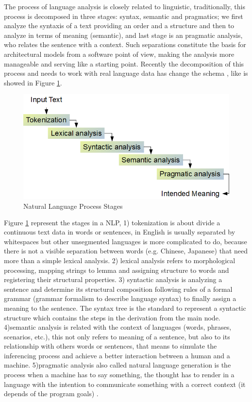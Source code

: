 \documentclass[12pt]{report}
\begin{document}
The process of language analysis is closely related to linguistic, traditionally, this process is decomposed in three stages: syntax, semantic and pragmatics; we first analyze the syntaxis of a text providing an order and a structure and then to analyze in terms of meaning (semantic), and last stage is an pragmatic analysis, who relates the sentence with a context. Such separations constitute the basis for architectural models from a software point of view, making the analysis more manageable and serving like a starting point. Recently the decomposition of this process and needs to work with real language data has change the schema \cite{Indurkhya2010}, like is showed in Figure \ref{figure:NLP_Stages}.

\begin{figure}[H]	
	\centering
	\includegraphics[width=150mm, scale = 1]{images/4_nlp.png}	
	\caption{Natural Language Process Stages}	
	\label{figure:NLP_Stages}
\end{figure}

Figure \ref{figure:NLP_Stages} represent the stages in a \ac{NLP}, 1) tokenization is about divide a continuous text data in words or sentences, in English is usually separated by whitespaces but other unsegmented languages is more complicated to do, because there is not a visible separation between words (e.g. Chinese, Japanese) that need more than a simple lexical analysis. 2) lexical analysis refers to morphological processing, mapping strings to lemma and assigning structure to words and registering their structural properties. 3) syntactic analysis is analyzing a sentence and determine its structural composition following rules of a formal grammar (grammar formalism to describe language syntax) to finally assign a meaning to the sentence. The syntax tree is the standard to represent a syntactic structure which contains the steps in the derivation from the main node. 4)semantic analysis is related with the context of languages (words, phrases, scenarios, etc.), this not only refers to meaning of a sentence, but also to its relationship with others words or sentences, that means to simulate the inferencing process and achieve a better interaction between a human and a machine.  5)pragmatic analysis also called natural language generation is the process when a machine has to say something, the thought has to render in a language with the intention to communicate something with a correct context (it depends of the program goals) \cite{ Indurkhya2010}.
\end{document}
